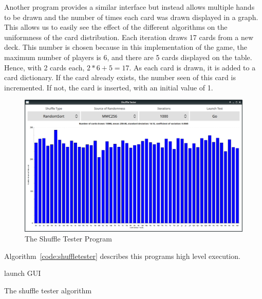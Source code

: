 Another program provides a similar interface but instead allows multiple hands 
to be drawn and the number of times each card was drawn displayed in a graph. 
This allows us to easily see the effect of the different algorithms on the 
uniformness of the card distribution. Each iteration draws 17 cards from
a new deck. This number is chosen because in this implementation of the game,
the maximum number of players is 6, and there are 5 cards displayed on the
table. Hence, with 2 cards each, $2 * 6 + 5 = 17$. As each card is drawn,
it is added to a card dictionary. If the card already exists, the number seen
of this card is incremented. If not, the card is inserted, with an initial
value of 1. 

\begin{figure}[H]
    \centering
    \includegraphics[width=0.8\linewidth]{../images/shuffletester.png}
    \caption{The Shuffle Tester Program}%
    \label{fig:shuffletester}
\end{figure}

Algorithm~\ref{code:shuffletester} describes this programs high
level execution.

\vspace{0.3cm}

\begin{algorithm}[H]
     launch GUI\;
\caption{The shuffle tester algorithm}%
\label{code:shuffletester}
\end{algorithm}


